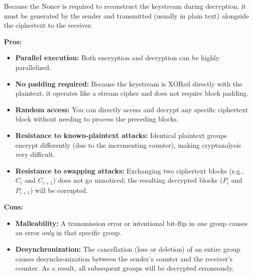 Because the Nonce is required to reconstruct the keystream during decryption, it must be generated by the sender and transmitted (usually in plain text) alongside the ciphertext to the receiver.

\textbf{Pros:}
\begin{itemize}
    \item \textbf{Parallel execution:} Both encryption and decryption can be highly parallelized.
    \item \textbf{No padding required:} Because the keystream is XORed directly with the plaintext, it operates like a stream cipher and does not require block padding.
    \item \textbf{Random access:} You can directly access and decrypt any specific ciphertext block without needing to process the preceding blocks.
    \item \textbf{Resistance to known-plaintext attacks:} Identical plaintext groups encrypt differently (due to the incrementing counter), making cryptanalysis very difficult.
    \item \textbf{Resistance to swapping attacks:} Exchanging two ciphertext blocks (e.g., $C_i$ and $C_{i+1}$) does not go unnoticed; the resulting decrypted blocks ($P_i$ and $P_{i+1}$) will be corrupted.
\end{itemize}

\textbf{Cons:}
\begin{itemize}
    \item \textbf{Malleability:} A transmission error or intentional bit-flip in one group causes an error \textit{only} in that specific group.
    \item \textbf{Desynchronization:} The cancellation (loss or deletion) of an entire group causes desynchronization between the sender's counter and the receiver's counter. As a result, all subsequent groups will be decrypted erroneously.
\end{itemize}

